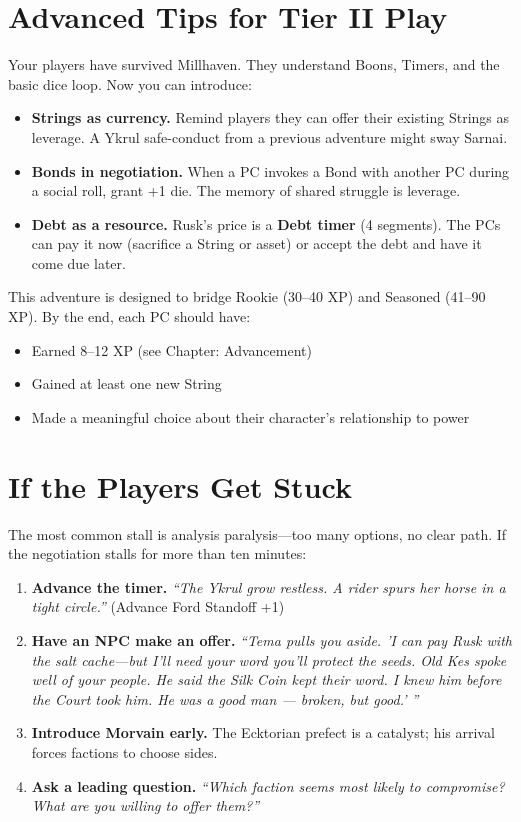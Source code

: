 \documentclass[10pt,twoside]{book}
\begin{document}
\section*{Advanced Tips for Tier II Play}

Your players have survived Millhaven. They understand Boons, Timers, and the basic dice loop. Now you can introduce:

\begin{itemize}
\item \textbf{Strings as currency.} Remind players they can offer their existing Strings as leverage. A Ykrul safe-conduct from a previous adventure might sway Sarnai.
\item \textbf{Bonds in negotiation.} When a PC invokes a Bond with another PC during a social roll, grant +1 die. The memory of shared struggle is leverage.
\item \textbf{Debt as a resource.} Rusk's price is a \textbf{Debt timer} (4 segments). The PCs can pay it now (sacrifice a String or asset) or accept the debt and have it come due later.
\end{itemize}

\begin{mechanicbox}
This adventure is designed to bridge Rookie (30--40 XP) and Seasoned (41--90 XP). By the end, each PC should have:
\begin{itemize}
\item Earned 8--12 XP (see Chapter: Advancement)
\item Gained at least one new String
\item Made a meaningful choice about their character's relationship to power
\end{itemize}
\end{mechanicbox}

\section*{If the Players Get Stuck}

The most common stall is analysis paralysis---too many options, no clear path. If the negotiation stalls for more than ten minutes:

\begin{enumerate}
\item \textbf{Advance the timer.} \textit{``The Ykrul grow restless. A rider spurs her horse in a tight circle.''} (Advance Ford Standoff +1)
\item \textbf{Have an NPC make an offer.} \textit{``Tema pulls you aside. 'I can pay Rusk with the salt cache---but I'll need your word you'll protect the seeds. Old Kes spoke well of your people. He said the Silk Coin kept their word. I knew him before the Court took him. He was a good man --- broken, but good.' ''}
\item \textbf{Introduce Morvain early.} The Ecktorian prefect is a catalyst; his arrival forces factions to choose sides.
\item \textbf{Ask a leading question.} \textit{``Which faction seems most likely to compromise? What are you willing to offer them?''}
\end{enumerate}
\end{document}
